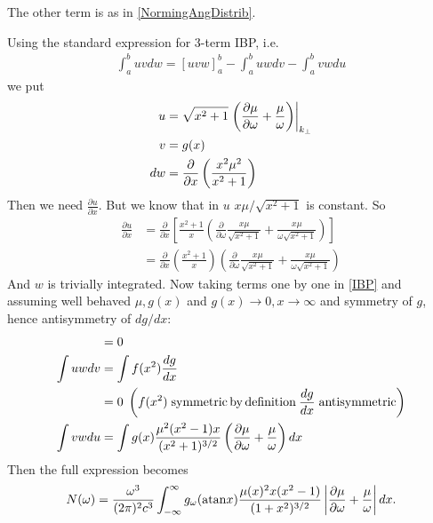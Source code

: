\documentclass[]{article}
\begin{document}
The other term is as in \ref{NormingAngDistrib}.

Using the standard expression for 3-term IBP, i.e.
\begin{align}\label{IBP}
\int_a^b u v dw = [uvw]_a^b - \int_a^b uw dv - \int_a^b vw du
\end{align} we put
\begin{align}
u&= \sqrt{x^2 +1} \left.\left( \frac{\partial \mu}{\partial \omega} + \frac {\mu}{\omega}\right) \right|_{k_\perp}\\
v&=g(x)\\
dw &= \frac{\partial}{\partial x}\left(\frac{x^2 \mu^2}{x^2 +1}\right)
\end{align}
Then we need $\frac{\partial u}{\partial x}$. But we know that in $u$ $ x \mu / \sqrt{x^2 +1}$ is constant. So
\begin{align}
\frac{\partial u}{\partial x} &= \frac{\partial}{\partial x} \left[ \frac{x^2+1}{x} \left( \frac{\partial}{\partial \omega} \frac{x \mu}{\sqrt{x^2+1}}  + \frac{x \mu}{\omega\sqrt{x^2+1}} \right)\right]\\
&=\frac{\partial}{\partial x} \left(\frac{x^2+1}{x} \right) \left( \frac{\partial}{\partial \omega} \frac{x \mu}{\sqrt{x^2+1}}  + \frac{x \mu}{\omega\sqrt{x^2+1}} \right)
\end{align}
And $w$ is trivially integrated.
Now taking terms one by one in \ref{IBP} and assuming well behaved $\mu, g(x)$ and $g(x)\rightarrow 0, x\rightarrow \infty$ and symmetry of $g$, hence antisymmetry of $dg/dx$:
\begin{align}
[uvw] &= 0 \\
\int u w dv &= \int f(x^2) \frac{dg}{dx}\notag\\
&= 0 \; \left(f(x^2) \;\mathrm{symmetric \,by\, definition}\: \frac{dg}{dx} \;\mathrm{antisymmetric}\right)\\
\int vw du &= \int g(x) \frac{\mu^2 (x^2-1) x}{(x^2 +1)^{3/2}} \left( \frac{\partial \mu}{\partial \omega} + \frac{ \mu}{\omega} \right)  d x
\end{align}
Then the full expression becomes \begin{equation}\label{N_IBP}
N(\omega) = \frac{\omega^3}{(2\pi)^2 c^3} \int_{-\infty}^\infty g_\omega( \mathrm{atan} x ) 
 \frac{\mu(x)^2 x (x^2-1)}{(1+x^2)^{3/2}}
 \left| \frac{\partial \mu}{\partial \omega} + \frac {\mu}{\omega}\right|
 d x .
\end{equation}
\end{document}
